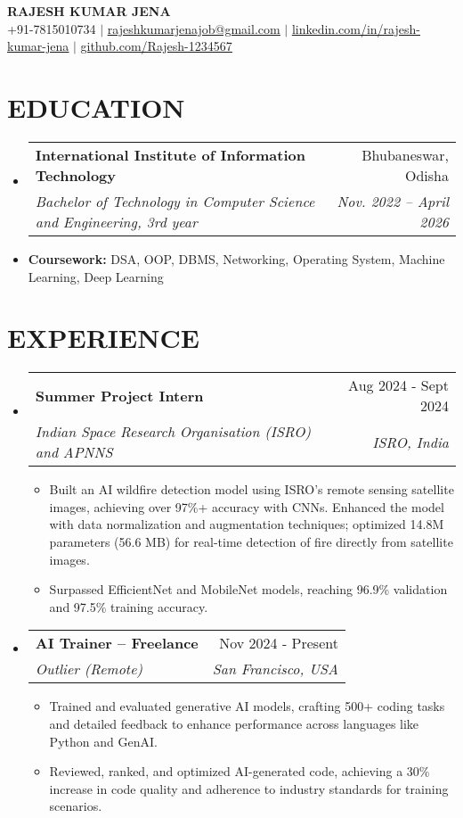 \documentclass[letterpaper,11pt]{article}
\makeatletter
\newcommand{\resumeItem}[1]{\item\small{#1 \vspace{-2pt}}}
\newcommand{\resumeSubheading}[4]{
  \vspace{-2pt}\item
    \begin{tabular*}{0.97\textwidth}[t]{l@{\extracolsep{\fill}}r}
      \textbf{#1} & #2 \\
      \textit{\small#3} & \textit{\small #4} \\
    \end{tabular*}\vspace{-7pt}
}
\newcommand{\resumeSubHeadingListStart}{\begin{itemize}[leftmargin=0.15in, label={}]}
\newcommand{\resumeSubHeadingListEnd}{\end{itemize}}
\newcommand{\resumeItemListStart}{\begin{itemize}}
\newcommand{\resumeItemListEnd}{\end{itemize}\vspace{-5pt}}
\makeatother
\begin{document}
\begin{center}
    \textbf{\Huge \scshape RAJESH KUMAR JENA} \\ \vspace{1pt}
    \small +91-7815010734 $|$ \href{mailto:getrajeshkumarjena@gmail.com}{\underline{rajeshkumarjenajob@gmail.com}} $|$ 
    \href{https://linkedin.com/in/rajesh-kumar-jena}{\underline{linkedin.com/in/rajesh-kumar-jena}} $|$
    \href{https://github.com/Rajesh-1234567}{\underline{github.com/Rajesh-1234567}}
\end{center}

\section{\textbf{EDUCATION}}
\resumeSubHeadingListStart
    \resumeSubheading
      {International Institute of Information Technology}{Bhubaneswar, Odisha}
      {Bachelor of Technology in Computer Science and Engineering, 3rd year}{Nov. 2022 -- April 2026}
      \resumeItem{\textbf{ Coursework:} DSA, OOP, DBMS, Networking, Operating System, Machine Learning, Deep Learning}
\resumeSubHeadingListEnd

\section{\textbf{EXPERIENCE}}
\resumeSubHeadingListStart
    \resumeSubheading
      {Summer Project Intern}{Aug 2024 - Sept 2024}
      {Indian Space Research Organisation (ISRO) and APNNS }{ISRO, India}
      \resumeItemListStart
        \resumeItem{Built an AI wildfire detection model using ISRO's remote sensing satellite images, achieving over 97\%+ accuracy with CNNs. Enhanced the model with data normalization and augmentation techniques; optimized 14.8M parameters (56.6 MB) for real-time detection of fire directly from satellite images.}
        \resumeItem{Surpassed EfficientNet and MobileNet models, reaching 96.9\% validation and 97.5\% training accuracy.}
      \resumeItemListEnd
      \resumeSubheading
      {AI Trainer – Freelance}{Nov 2024 - Present}
      {Outlier (Remote)}{San Francisco, USA}
      \resumeItemListStart
        \resumeItem{Trained and evaluated generative AI models, crafting 500+ coding tasks and detailed feedback to enhance performance across languages like Python and GenAI.}
        \resumeItem{Reviewed, ranked, and optimized AI-generated code, achieving a 30\% increase in code quality and adherence to industry standards for training scenarios.}
      \resumeItemListEnd
\resumeSubHeadingListEnd
\end{document}
